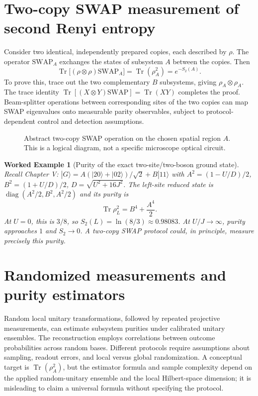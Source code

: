 \documentclass[11pt,a4paper]{article}
\newtheorem{example}{Worked Example}
\newcommand{\tr}{\operatorname{Tr}}
\begin{document}
\section{Two-copy SWAP measurement of second Renyi entropy}
Consider two identical, independently prepared copies, each described by $\rho$. The operator $\mathrm{SWAP}_A$ exchanges the states of subsystem $A$ between the copies. Then
\begin{equation}\boxed{\tr\big[(\rho\otimes\rho)\mathrm{SWAP}_A\big]=\tr(\rho_A^2)=e^{-S_2(A)}.}\label{eq:swap}\end{equation}
To prove this, trace out the two complementary $B$ subsystems, giving $\rho_A\otimes\rho_A$. The trace identity $\tr[(X\otimes Y)\mathrm{SWAP}]=\tr(XY)$ completes the proof. Beam-splitter operations between corresponding sites of the two copies can map SWAP eigenvalues onto measurable parity observables, subject to protocol-dependent control and detection assumptions.
\begin{figure}[ht]\centering{}\caption{Abstract two-copy SWAP operation on the chosen spatial region $A$. This is a logical diagram, not a specific microscope optical circuit.}\end{figure}
\begin{example}[Purity of the exact two-site/two-boson ground state]
Recall Chapter V: $|G\rangle=A(|20\rangle+|02\rangle)/\sqrt2+B|11\rangle$ with $A^2=(1-U/D)/2$, $B^2=(1+U/D)/2$, $D=\sqrt{U^2+16J^2}$. The left-site reduced state is $\operatorname{diag}(A^2/2,B^2,A^2/2)$ and its purity is
\begin{equation}\tr\rho_L^2=B^4+\frac{A^4}{2}.\end{equation}
At $U=0$, this is $3/8$, so $\boxed{S_2(L)=\ln(8/3)\approx0.98083}$. At $U/J\to\infty$, purity approaches $1$ and $S_2\to0$. A two-copy SWAP protocol could, in principle, measure precisely this purity.
\end{example}
\section{Randomized measurements and purity estimators}
Random local unitary transformations, followed by repeated projective measurements, can estimate subsystem purities under calibrated unitary ensembles. The reconstruction employs correlations between outcome probabilities across random bases. Different protocols require assumptions about sampling, readout errors, and local versus global randomization. A conceptual target is $\tr(\rho_A^2)$, but the estimator formula and sample complexity depend on the applied random-unitary ensemble and the local Hilbert-space dimension; it is misleading to claim a universal formula without specifying the protocol.
\end{document}
